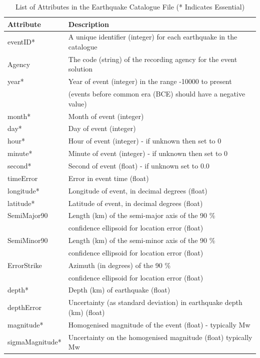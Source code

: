 \begin{table}
\begin{tabular}{|l|l|}  \hline 
Attribute & Description \\ \hline
eventID* & A unique identifier (integer) for each earthquake in the catalogue \\
Agency & The code (string) of the recording agency for the event solution  \\
year* & Year of event (integer) in the range -10000 to present \\
 & (events before common era (BCE) should have a negative value)\\
month* & Month of event (integer)\\
day* & Day of event (integer) \\
hour* & Hour of event (integer) - if unknown then set to 0 \\
minute* & Minute of event (integer) - if unknown then set to 0 \\
second* & Second of event (float) - if unknown set to 0.0 \\
timeError & Error in event time (float) \\
longitude* & Longitude of event, in decimal degrees (float) \\
latitude* & Latitude of event, in decimal degrees (float) \\
SemiMajor90 & Length (km) of the semi-major axis of the 90 \% \\
            & confidence ellipsoid for location error (float) \\
SemiMinor90 & Length (km) of the semi-minor axis of the 90 \% \\
            & confidence ellipsoid for location error (float) \\
ErrorStrike & Azimuth (in degrees) of the 90 \% \\
            & confidence ellipsoid for location error (float) \\
depth* & Depth (km) of earthquake (float)\\
depthError & Uncertainty (as standard deviation) in earthquake depth (km) (float)\\
magnitude* & Homogenised magnitude of the event (float) - typically Mw \\
sigmaMagnitude* & Uncertainty on the homogenised magnitude (float) typically Mw \\ \hline
\end{tabular}
\caption{List of Attributes in the Earthquake Catalogue File (* Indicates Essential)}
\label{tab: EQCatalogueFormat}
\end{table}

